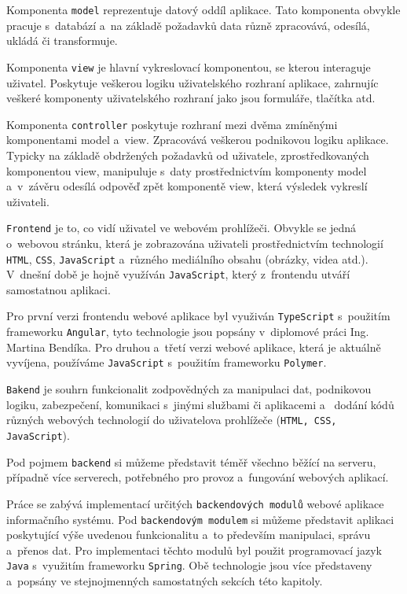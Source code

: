 \documentclass[twoside, 12pt]{article}
\begin{document}
{Komponenta \texttt{model} reprezentuje datový oddíl aplikace.
Tato komponenta obvykle pracuje s~databází a~na základě požadavků
data různě zpracovává, odesílá, ukládá či transformuje.

Komponenta \texttt{view} je hlavní vykreslovací komponentou, se kterou interaguje uživatel.
Poskytuje veškerou logiku uživatelského rozhraní aplikace,
zahrnujíc veškeré komponenty uživatelského rozhraní jako jsou formuláře, tlačítka
atd.

Komponenta \texttt{controller} poskytuje rozhraní mezi dvěma zmíněnými komponentami
model a~view. Zpracovává veškerou podnikovou logiku aplikace.
Typicky na základě obdržených požadavků od uživatele, zprostředkovaných komponentou
view, manipuluje s~daty prostřednictvím komponenty model a~v~závěru odesílá
odpověď zpět komponentě view, která výsledek vykreslí uživateli.



\texttt{Frontend} je to, co vidí uživatel ve webovém prohlížeči.
Obvykle se jedná o~webovou stránku, která je zobrazována uživateli prostřednictvím
technologií \texttt{HTML}, \texttt{CSS}, \texttt{JavaScript} a~různého mediálního obsahu (obrázky, videa atd.).
V~dnešní době je hojně využíván \texttt{JavaScript}, který z~frontendu utváří samostatnou aplikaci.

Pro první verzi frontendu webové aplikace byl využiván \texttt{TypeScript}
s~použitím frameworku \texttt{Angular},
tyto technologie jsou popsány v~diplomové práci Ing. Martina Bendíka.
Pro druhou a~třetí verzi webové aplikace, která je aktuálně vyvíjena,
používáme \texttt{JavaScript} s~použitím frameworku \texttt{Polymer}.


\texttt{Bakend} je souhrn funkcionalit zodpovědných za manipulaci dat,
podnikovou logiku, zabezpečení, komunikaci s~jinými službami či aplikacemi a~
dodání kódů různých webových technologií do uživatelova prohlížeče (\texttt{HTML, CSS, JavaScript}).
\par
Pod pojmem \texttt{backend} si můžeme představit téměř všechno běžící na serveru,
případně více serverech, potřebného pro provoz a~fungování webových aplikací.
\cite{odinuv}


Práce se zabývá implementací určitých \texttt{backendových modulů} webové aplikace informačního systému.
Pod \texttt{backendovým modulem} si můžeme představit aplikaci
poskytující výše uvedenou funkcionalitu a~to především manipulaci, správu a~přenos dat.
Pro implementaci těchto modulů byl použit programovací jazyk \texttt{Java} s~využitím frameworku \texttt{Spring}.
Obě technologie jsou více představeny a~popsány ve stejnojmenných samostatných sekcích této kapitoly.

}
\end{document}
